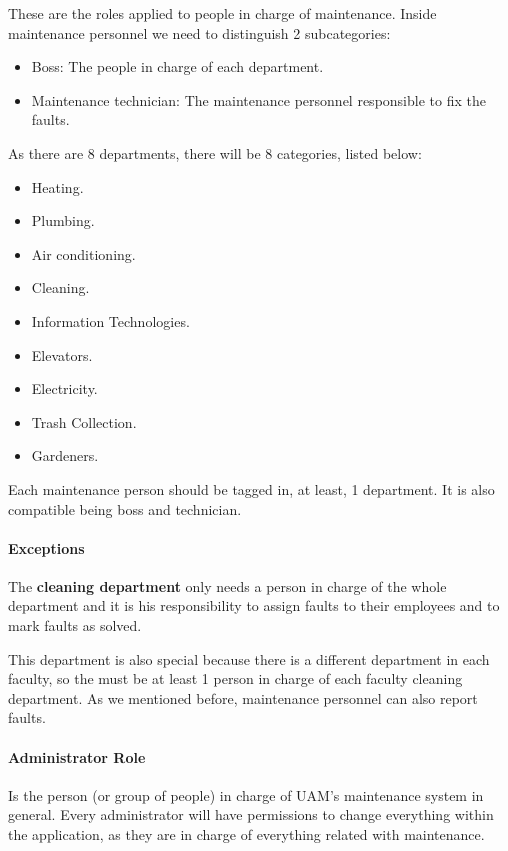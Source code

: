 These are the roles applied to people in charge of maintenance. Inside maintenance personnel we need to distinguish 2 subcategories:

\begin{itemize}
\item Boss: The people in charge of each department.
\item Maintenance technician: The maintenance personnel responsible to fix the faults.
\end{itemize}

As there are 8 departments, there will be 8 categories, listed below:

\begin{itemize}
\item Heating.
\item Plumbing.
\item Air conditioning.
\item Cleaning.
\item Information Technologies.
\item Elevators.
\item Electricity.
\item Trash Collection.
\item Gardeners.
\end{itemize}

Each maintenance person should be tagged in, at least, 1 department. It is also compatible being boss and technician.

\paragraph{Exceptions} The \textbf{cleaning department} only needs a person in charge of the whole department and it is his responsibility to assign faults to their employees and to mark faults as solved.

This department is also special because there is a different department in each faculty, so the must be at least 1 person in charge of each faculty cleaning department. As we mentioned before, maintenance personnel can also report faults.

\paragraph{Administrator Role} Is the person (or group of people) in charge of UAM's maintenance system in general. Every administrator will have permissions to change everything within the application, as they are in charge of everything related with maintenance.

